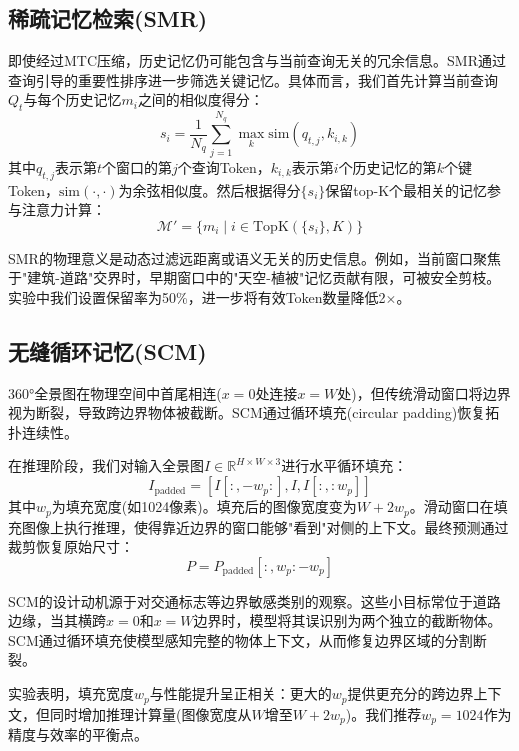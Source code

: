 \subsection{稀疏记忆检索(SMR)}

即使经过MTC压缩，历史记忆仍可能包含与当前查询无关的冗余信息。SMR通过查询引导的重要性排序进一步筛选关键记忆。具体而言，我们首先计算当前查询$Q_t$与每个历史记忆$m_i$之间的相似度得分：
\begin{equation}
s_i = \frac{1}{N_q} \sum_{j=1}^{N_q} \max_{k} \text{sim}(q_{t,j}, k_{i,k})
\end{equation}
其中$q_{t,j}$表示第$t$个窗口的第$j$个查询Token，$k_{i,k}$表示第$i$个历史记忆的第$k$个键Token，$\text{sim}(\cdot, \cdot)$为余弦相似度。然后根据得分$\{s_i\}$保留top-K个最相关的记忆参与注意力计算：
\begin{equation}
\mathcal{M}' = \{m_i \mid i \in \text{TopK}(\{s_i\}, K)\}
\end{equation}

SMR的物理意义是动态过滤远距离或语义无关的历史信息。例如，当前窗口聚焦于"建筑-道路"交界时，早期窗口中的"天空-植被"记忆贡献有限，可被安全剪枝。实验中我们设置保留率为50\%，进一步将有效Token数量降低2$\times$。

\subsection{无缝循环记忆(SCM)}

360°全景图在物理空间中首尾相连($x=0$处连接$x=W$处)，但传统滑动窗口将边界视为断裂，导致跨边界物体被截断。SCM通过循环填充(circular padding)恢复拓扑连续性。

在推理阶段，我们对输入全景图$I \in \mathbb{R}^{H \times W \times 3}$进行水平循环填充：
\begin{equation}
I_{\text{padded}} = [I[:, -w_p:], I, I[:, :w_p]]
\end{equation}
其中$w_p$为填充宽度(如1024像素)。填充后的图像宽度变为$W + 2w_p$。滑动窗口在填充图像上执行推理，使得靠近边界的窗口能够"看到"对侧的上下文。最终预测通过裁剪恢复原始尺寸：
\begin{equation}
P = P_{\text{padded}}[:, w_p:-w_p]
\end{equation}

SCM的设计动机源于对交通标志等边界敏感类别的观察。这些小目标常位于道路边缘，当其横跨$x=0$和$x=W$边界时，模型将其误识别为两个独立的截断物体。SCM通过循环填充使模型感知完整的物体上下文，从而修复边界区域的分割断裂。

实验表明，填充宽度$w_p$与性能提升呈正相关：更大的$w_p$提供更充分的跨边界上下文，但同时增加推理计算量(图像宽度从$W$增至$W+2w_p$)。我们推荐$w_p=1024$作为精度与效率的平衡点。

